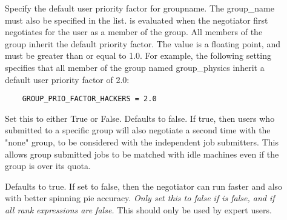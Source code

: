 \begin{description}






\item[]

    Specify the default user priority factor for groupname.  The
    group\_name must also be specified in the 
    list.   is evaluated when
    the negotiator first negotiates for the user as a member of
    the group.  All members of the group inherit the default
    priority factor.  The value is a floating point, and must be
    greater than or equal to 1.0.  For example, the following setting
    specifies that all member of the group named group\_physics
    inherit a default user priority factor of 2.0:
\begin{verbatim}
    GROUP_PRIO_FACTOR_HACKERS = 2.0
\end{verbatim}

\item[]
    Set this to either True or False.  Defaults to
	false.  If true, then users who submitted to a specific group will
	also negotiate a second time with the "none" group, to be
    considered with the independent job submitters. 
	This allows group submitted jobs to be matched with idle machines
	even if the group is over its quota.

\item[]
    Defaults to true.  If set to false, then the negotiator can run
	faster and also with better spinning pie accuracy.  \emph{Only set
	this to false if  is false, and
	if all  rank expressions are false.} This should
	only be used by expert 	users.
\end{description}

